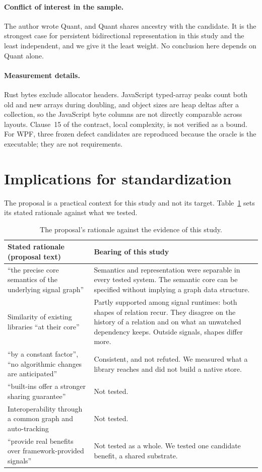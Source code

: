 \documentclass[11pt]{article}
\begin{document}
\paragraph{Conflict of interest in the sample.} The author wrote Quant, and Quant shares ancestry with the candidate. It is the strongest case for persistent bidirectional representation in this study and the least independent, and we give it the least weight. No conclusion here depends on Quant alone.

\paragraph{Measurement details.} Rust bytes exclude allocator headers. JavaScript typed-array peaks count both old and new arrays during doubling, and object sizes are heap deltas after a collection, so the JavaScript byte columns are not directly comparable across layouts. Clause~15 of the contract, local complexity, is not verified as a bound. For WPF, three frozen defect candidates are reproduced because the oracle is the executable; they are not requirements.

\section{Implications for standardization}
\label{sec:implications}

The proposal is a practical context for this study and not its target. Table~\ref{tab:rationale} sets its stated rationale against what we tested.

\begin{table}[tbp]
\centering
\footnotesize
\begin{tabular}{p{6.4cm} p{8.6cm}}
\toprule
Stated rationale (proposal text) & Bearing of this study \\
\midrule
``the precise core semantics of the underlying signal graph'' & Semantics and representation were separable in every tested system. The semantic core can be specified without implying a graph data structure. \\
\addlinespace
Similarity of existing libraries ``at their core'' & Partly supported among signal runtimes: both shapes of relation recur. They disagree on the history of a relation and on what an unwatched dependency keeps. Outside signals, shapes differ more. \\
\addlinespace
``by a constant factor'', ``no algorithmic changes are anticipated'' & Consistent, and not refuted. We measured what a library reaches and did not build a native store. \\
\addlinespace
``built-ins offer a stronger sharing guarantee'' & Not tested. \\
\addlinespace
Interoperability through a common graph and auto-tracking & Not tested. \\
\addlinespace
``provide real benefits over framework-provided signals'' & Not tested as a whole. We tested one candidate benefit, a shared substrate. \\
\bottomrule
\end{tabular}
\caption{The proposal's rationale against the evidence of this study.}
\label{tab:rationale}
\end{table}
\end{document}
